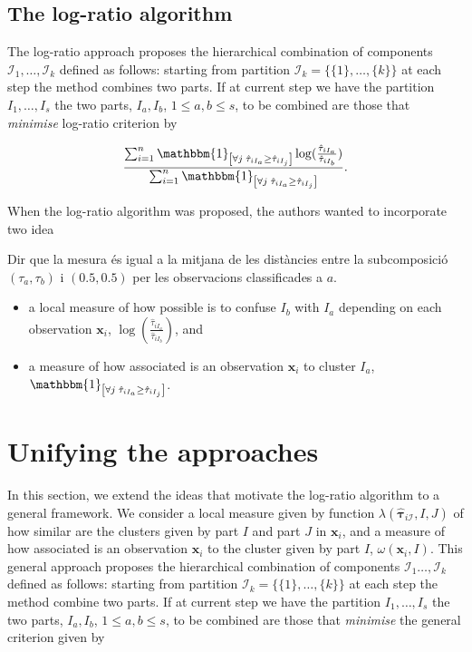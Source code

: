 \documentclass[10pt, a4paper]{article}
\newcommand{\m}[1]{\boldsymbol{#1}}
\begin{document}
\subsection*{The log-ratio algorithm}

The log-ratio approach \citep{ComasCufi2013} proposes the hierarchical combination of components $\mathcal{I}_1, \dots, \mathcal{I}_k$ defined as follows: starting from partition $\mathcal{I}_k = \{\{1\},\dots, \{k\}\}$ at each step the method combines two parts. If at current step we have the partition  $I_1, \dots, I_s$ the two parts, $I_a, I_b$, $1 \leq a,b \leq s$,  to be combined are those that \emph{minimise} log-ratio criterion by

\[
\frac{\sum_{i=1}^n \mathbbm{1}_{\left[ \forall j\; \hat{\tau}_{i I_{a}} \geq \hat{\tau}_{iI_j} \right]} \log( \frac{ \hat{\tau}_{iI_a} }{ \hat{\tau}_{iI_b} })}{\sum_{i=1}^n \mathbbm{1}_{\left[ \forall j\; \hat{\tau}_{i I_{a}} \geq \hat{\tau}_{iI_j} \right]}}.
\]

When the log-ratio algorithm was proposed, the authors wanted to incorporate two idea

{\color{red} Dir que la mesura és igual a la mitjana de les distàncies entre la subcomposició $(\tau_a, \tau_b)$ i $(0.5,0.5)$ per les observacions classificades a $a$.}

\begin{itemize}
\item a local measure of how possible is to confuse $I_b$ with $I_a$ depending on each observation $\m x_i$, $\log( \frac{ \hat{\tau}_{iI_a} }{ \hat{\tau}_{iI_b} })$, and
\item a measure of how associated is an observation $\m x_i$ to cluster $I_a$, $\mathbbm{1}_{\left[ \forall j\; \hat{\tau}_{i I_{a}} \geq \hat{\tau}_{iI_j} \right]}$.
\end{itemize}

\section{Unifying the approaches}

In this section, we extend the ideas that motivate the log-ratio algorithm to a general framework. We consider a local measure given by function $\lambda(\hat{\m\tau}_{i \mathcal{I}}, I, J)$ of how similar are the clusters given by part $I$ and part $J$ in $\m x_i$, and a measure of how associated is an observation $\m x_i$ to the cluster given by part $I$, $\omega(\m x_i, I)$. This general approach proposes the hierarchical combination of components $\mathcal{I}_1 \dots, \mathcal{I}_k$ defined as follows: starting from partition $\mathcal{I}_k = \{\{1\},\dots, \{k\}\}$ at each step the method combine two parts. If at current step we have the partition  $I_1, \dots, I_s$ the two parts, $I_a, I_b$, $1 \leq a,b \leq s$,  to be combined are those that \emph{minimise} the general criterion given by
\end{document}
